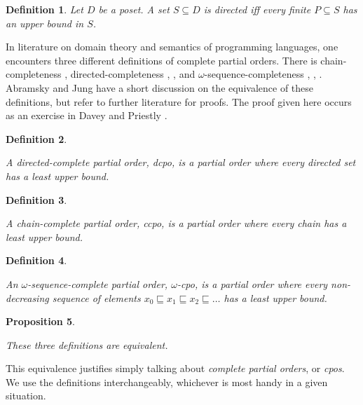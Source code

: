 \documentclass[a4paper]{article}
\newcommand{\below}{\sqsubseteq}
\newtheorem{definition}{Definition}[section]
\newtheorem{proposition}[definition]{Proposition}
\begin{document}
\begin{definition}

Let $D$ be a poset. A set $S \subseteq D$ is \emph{directed} iff every finite
$P \subseteq S$ has an upper bound in $S$.

\end{definition}


In literature on domain theory and semantics of programming languages, one
encounters three different definitions of complete partial orders.  There is
chain-completeness \cite{Moschovakis1994}, directed-completeness
\cite{DaveyPriestly1990}, \cite{Gunter1992}, and $\omega$-sequence-completeness
\cite{Allison1986}, \cite{Winskel1993}, \cite{BarrWells1990}. Abramsky and Jung
\cite{Abramsky1994} have a short discussion on the equivalence of these
definitions, but refer to further literature for proofs. The proof given here
occurs as an exercise in Davey and Priestly \cite{DaveyPriestly1990}.


\begin{definition} \label{defCpoDirectedComplete}

A directed-complete partial order, \emph{dcpo}, is a partial order where every
directed set has a least upper bound.

\end{definition}


\begin{definition} \label{defCpoChainComplete}

A chain-complete partial order, \emph{ccpo}, is a partial order where every chain
has a least upper bound.

\end{definition}


\begin{definition} \label{defCpoOmegaSequenceComplete}

An $\omega$-sequence-complete partial order, \emph{$\omega$-cpo}, is a partial
order where every non-decreasing sequence of elements $x_0 \below x_1 \below x_2
\below \ldots $ has a least upper bound.

\end{definition}


\begin{proposition} \label{propDefinitionsAreEquivalent}

These three definitions are equivalent.

\end{proposition}

This equivalence justifies simply talking about \emph{complete partial orders},
or \emph{cpos}. We use the definitions interchangeably, whichever is most handy
in a given situation.
\end{document}
